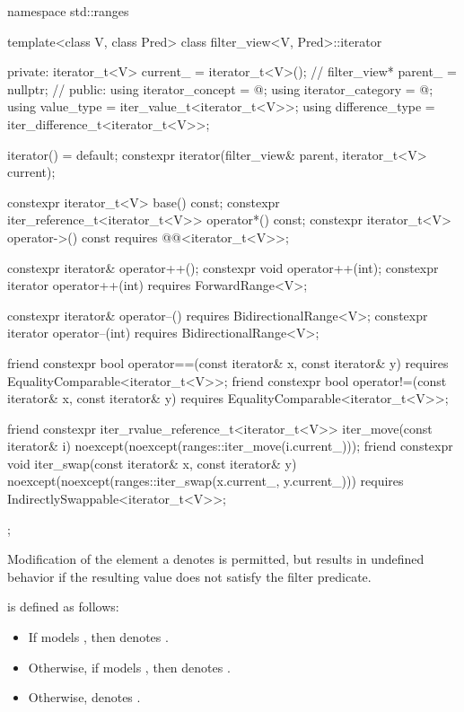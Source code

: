 %
\begin{codeblock}
namespace std::ranges {
  template<class V, class Pred>
  class filter_view<V, Pred>::iterator {
  private:
    iterator_t<V> current_ = iterator_t<V>();   // \expos
    filter_view* parent_ = nullptr;             // \expos
  public:
    using iterator_concept  = @\seebelow@;
    using iterator_category = @\seebelow@;
    using value_type        = iter_value_t<iterator_t<V>>;
    using difference_type   = iter_difference_t<iterator_t<V>>;

    iterator() = default;
    constexpr iterator(filter_view& parent, iterator_t<V> current);

    constexpr iterator_t<V> base() const;
    constexpr iter_reference_t<iterator_t<V>> operator*() const;
    constexpr iterator_t<V> operator->() const
      requires @@<iterator_t<V>>;

    constexpr iterator& operator++();
    constexpr void operator++(int);
    constexpr iterator operator++(int) requires ForwardRange<V>;

    constexpr iterator& operator--() requires BidirectionalRange<V>;
    constexpr iterator operator--(int) requires BidirectionalRange<V>;

    friend constexpr bool operator==(const iterator& x, const iterator& y)
      requires EqualityComparable<iterator_t<V>>;
    friend constexpr bool operator!=(const iterator& x, const iterator& y)
      requires EqualityComparable<iterator_t<V>>;

    friend constexpr iter_rvalue_reference_t<iterator_t<V>> iter_move(const iterator& i)
      noexcept(noexcept(ranges::iter_move(i.current_)));
    friend constexpr void iter_swap(const iterator& x, const iterator& y)
      noexcept(noexcept(ranges::iter_swap(x.current_, y.current_)))
      requires IndirectlySwappable<iterator_t<V>>;
  };
}
\end{codeblock}

\pnum
Modification of the element a  denotes is
permitted, but results in undefined behavior if the resulting value does not
satisfy the filter predicate.

\pnum
{} is defined as follows:
\begin{itemize}
\item If  models , then
 denotes .

\item Otherwise, if  models , then
 denotes .

\item Otherwise,  denotes .
\end{itemize}

